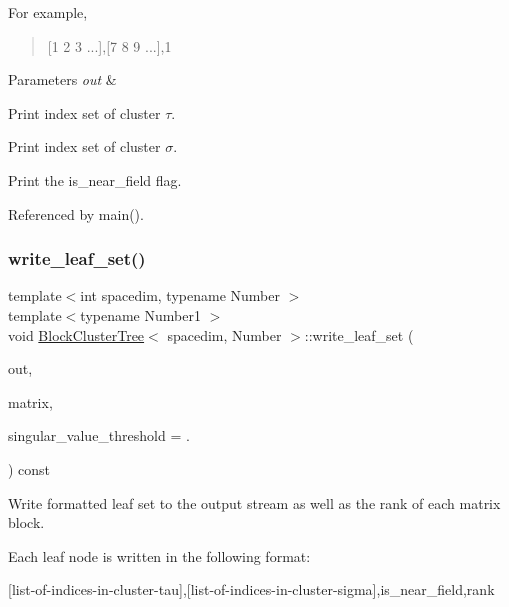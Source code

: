 For example,

\begin{quote}
\mbox{[}1 2 3 ...\mbox{]},\mbox{[}7 8 9 ...\mbox{]},1 \end{quote}

\begin{DoxyParams}{Parameters}
{\em out} & \\
\hline
\end{DoxyParams}
Print index set of cluster $\tau$.

Print index set of cluster $\sigma$.

Print the {\ttfamily is\+\_\+near\+\_\+field} flag.

Referenced by main().

\mbox{\label{classBlockClusterTree_a652b1c53dff2794e2f18343bf3988e19}} 
\subsubsection{\texorpdfstring{write\+\_\+leaf\+\_\+set()}{write\_leaf\_set()}\hspace{0.1cm}{\footnotesize\ttfamily [2/2]}}
{\footnotesize\ttfamily template$<$int spacedim, typename Number $>$ \\
template$<$typename Number1 $>$ \\
void \hyperlink{classBlockClusterTree}{Block\+Cluster\+Tree}$<$ spacedim, Number $>$\+::write\+\_\+leaf\+\_\+set (\begin{DoxyParamCaption}\item[{std\+::ostream \&}]{out,  }\item[{const \hyperlink{classLAPACKFullMatrixExt}{L\+A\+P\+A\+C\+K\+Full\+Matrix\+Ext}$<$ Number1 $>$ \&}]{matrix,  }\item[{const Number1}]{singular\+\_\+value\+\_\+threshold = {.} }\end{DoxyParamCaption}) const}

Write formatted leaf set to the output stream as well as the rank of each matrix block.

Each leaf node is written in the following format\+:

\begin{quote}


\end{quote}
\mbox{[}list-\/of-\/indices-\/in-\/cluster-\/tau\mbox{]},\mbox{[}list-\/of-\/indices-\/in-\/cluster-\/sigma\mbox{]},is\+\_\+near\+\_\+field,rank

